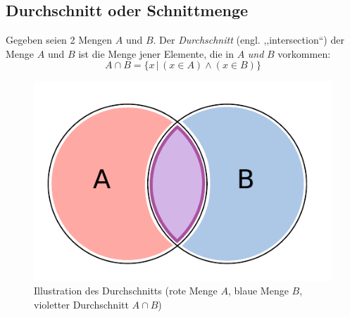 \subsection{Durchschnitt oder Schnittmenge}
%
Gegeben seien 2 Mengen $A$ und $B$. Der \emph{Durchschnitt} (engl. ,,intersection``)
der Menge $A$ und $B$ ist die Menge jener Elemente, die in $A$ \emph{und}
$B$ vorkommen:
\[
    A \cap B = \{x \,|\, (x \in A) \land (x \in B)\}
\]
%
\begin{figure}[p]
 \begin{center}
  \includegraphics{img/intersection.pdf}
  \caption{Illustration des Durchschnitts (rote Menge $A$, blaue Menge $B$,
        violetter Durchschnitt $A \cap B$)}
  \label{fig:intersection}
 \end{center}
\end{figure}

